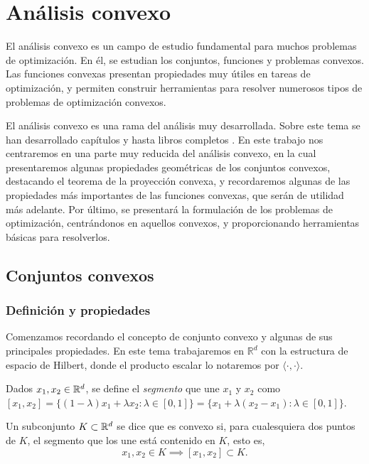 \chapter{Análisis convexo} \label{chapter:convex_analysis}

El análisis convexo es un campo de estudio fundamental para muchos problemas de optimización. En él, se estudian los conjuntos, funciones y problemas convexos. Las funciones convexas presentan propiedades muy útiles en tareas de optimización, y permiten construir herramientas para resolver numerosos tipos de problemas de optimización convexos.

El análisis convexo es una rama del análisis muy desarrollada. Sobre este tema se han desarrollado capítulos y hasta libros completos \cite{convexoptimization,convexanalysis,variations_convex}. En este trabajo nos centraremos en una parte muy reducida del análisis convexo, en la cual presentaremos algunas propiedades geométricas de los conjuntos convexos, destacando el teorema de la proyección convexa, y recordaremos algunas de las propiedades más importantes de las funciones convexas, que serán de utilidad más adelante. Por último, se presentará la formulación de los problemas de optimización, centrándonos en aquellos convexos, y proporcionando herramientas básicas para resolverlos.

\section{Conjuntos convexos}

\subsection{Definición y propiedades}

Comenzamos recordando el concepto de conjunto convexo y algunas de sus principales propiedades. En este tema trabajaremos en $\mathbb{R}^d$ con la estructura de espacio de Hilbert, donde el producto escalar lo notaremos por $\langle \cdot, \cdot \rangle$.

\begin{definition}
    Dados $x_1,x_2 \in \mathbb{R}^d$, se define el \emph{segmento} que une $x_1$ y $x_2$ como $[x_1,x_2] = \{ (1-\lambda) x_1 + \lambda x_2 \colon \lambda \in [0,1] \} = \{x_1 + \lambda(x_2-x_1) \colon \lambda \in [0,1] \}$.
\end{definition}

\begin{definition}
    Un subconjunto $K \subset \mathbb{R}^d$ se dice que es convexo si, para cualesquiera dos puntos de $K$, el segmento que los une está contenido en $K$, esto es,
    \[ x_1,x_2 \in K \implies [x_1,x_2] \subset K. \]
\end{definition}

